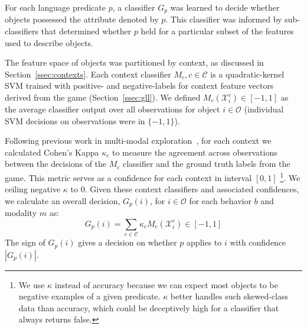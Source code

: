 For each language predicate $p$, a classifier $G_p$ was learned to decide whether objects possessed the attribute denoted by $p$.
This classifier was informed by sub-classifiers that determined whether $p$ held for a particular subset of the features used to describe objects.

The feature space of objects was partitioned by context, as discussed in Section~\ref{ssec:contexts}.
Each context classifier $M_{c}, c\in\mathcal{C}$ is a quadratic-kernel SVM trained with positive- and negative-labels for context feature vectors derived from the \ispy game (Section~\ref{ssec:gll}).
We defined $M_{c}(\mathcal{X}_i^c)\in [-1,1]$ as the average classifier output over all observations for object $i\in\mathcal{O}$ (individual SVM decisions on observations were in $\{-1,1\}$).

Following previous work in multi-modal exploration~\cite{sinapov:icra14}, for each context we calculated Cohen's Kappa $\kappa_{c}$ to measure the agreement across observations between the decisions of the $M_{c}$ classifier and the ground truth labels from the \ispy game. This metric serves as a confidence for each context in interval $[0,1]$ 
\footnote{We use $\kappa$ instead of accuracy because we can expect most objects to be negative examples of a given predicate. $\kappa$ better handles such skewed-class data than accuracy, which could be deceptively high for a classifier that always returns false.}.
We ceiling negative $\kappa$ to $0$.
Given these context classifiers and associated confidences, we calculate an overall decision, $G_p(i)$, for $i\in\mathcal{O}$ for each behavior $b$ and modality $m$ as:
\begin{equation}
	G_p(i) = \sum_{c\in\mathcal{C}}{\kappa_{c} M_{c}(\mathcal{X}_i^c)} \in [-1,1]
\end{equation}
The sign of $G_p(i)$ gives a decision on whether $p$ applies to $i$ with confidence $|G_p(i)|$.
